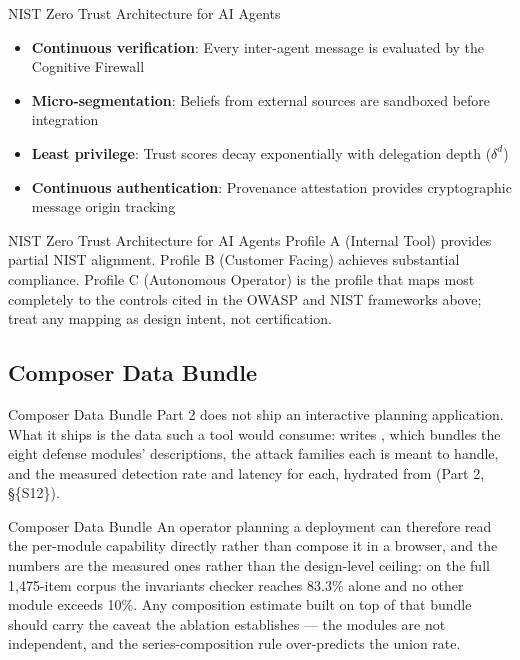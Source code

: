 \documentclass[
  ignorenonframetext,
]{beamer}
\providecommand{\tightlist}{%
  \setlength{\itemsep}{0pt}\setlength{\parskip}{0pt}}
\begin{document}
\begin{frame}[allowframebreaks]{NIST Zero Trust Architecture for AI
Agents}
\begin{itemize}
\tightlist
\item
  \textbf{Continuous verification}: Every inter-agent message is
  evaluated by the Cognitive Firewall
\item
  \textbf{Micro-segmentation}: Beliefs from external sources are
  sandboxed before integration
\item
  \textbf{Least privilege}: Trust scores decay exponentially with
  delegation depth (\(\delta^d\))
\item
  \textbf{Continuous authentication}: Provenance attestation provides
  cryptographic message origin tracking
\end{itemize}

\end{frame}

\begin{frame}[allowframebreaks]{NIST Zero Trust Architecture for AI
Agents}
Profile A (Internal Tool) provides partial NIST alignment. Profile B
(Customer Facing) achieves substantial compliance. Profile C (Autonomous
Operator) is the profile that maps most completely to the controls cited
in the OWASP and NIST frameworks above; treat any mapping as design
intent, not certification.
\end{frame}

\begin{frame}
\end{frame}

\subsection{Composer Data Bundle}\label{sec:cif-composer}

\begin{frame}{Composer Data Bundle}
Part 2 does not ship an interactive planning application. What it ships
is the data such a tool would consume:
 writes
, which bundles the eight
defense modules' descriptions, the attack families each is meant to
handle, and the measured detection rate and latency for each, hydrated
from  (Part 2,
\S\{S12\}).

\end{frame}

\begin{frame}{Composer Data Bundle}
An operator planning a deployment can therefore read the per-module
capability directly rather than compose it in a browser, and the numbers
are the measured ones rather than the design-level ceiling: on the full
1,475-item corpus the invariants checker reaches 83.3\% alone and no
other module exceeds 10\%. Any composition estimate built on top of that
bundle should carry the caveat the ablation establishes --- the modules
are not independent, and the series-composition rule over-predicts the
union rate.
\end{frame}
\end{document}
